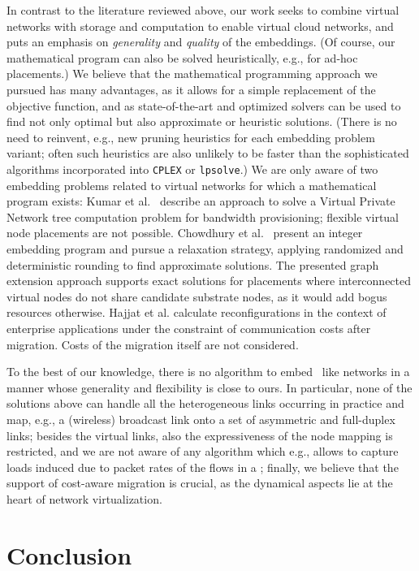 \documentclass[conference,10pt]{IEEEtran}
\newcommand{\CloudNet}{\text{CloudNet}}
\begin{document}
In contrast to the literature reviewed above, our work seeks to
combine virtual networks with storage and computation to enable
virtual cloud networks, and puts an emphasis on \emph{generality} and
\emph{quality} of the embeddings. (Of course, our mathematical
program can also be solved heuristically, e.g., for ad-hoc
placements.) We believe that the mathematical programming approach
we pursued has many advantages, as it allows for a simple
replacement of the objective function, and as state-of-the-art
and optimized solvers can be used to find not only optimal but also
approximate or heuristic solutions. (There is no need to reinvent,
e.g., new pruning heuristics for each embedding problem variant;
often such heuristics are also unlikely to be faster than the
sophisticated algorithms incorporated into \texttt{CPLEX} or
\texttt{lpsolve}.) We are only aware of two embedding problems
related to virtual networks for which a mathematical program exists:
Kumar et al.~\cite{hose} describe an approach to solve a Virtual
Private Network tree computation problem for bandwidth provisioning;
flexible virtual node placements are not possible. Chowdhury et
al.~\cite{infocom2009} present an integer embedding program and
pursue a relaxation strategy, applying randomized and deterministic
rounding to find approximate solutions. The presented graph
extension approach supports exact solutions for placements where
interconnected virtual nodes do not share candidate substrate nodes,
as it would add bogus resources otherwise.
Hajjat et al. \cite{clwardsigc11} calculate
reconfigurations in the context of enterprise applications under the
constraint of communication costs after migration. Costs of the
migration itself are not considered.

To the best of our knowledge, there is no algorithm to embed
\CloudNet\ like networks in a manner whose generality and
flexibility is close to ours. In particular, none of the solutions
above can handle all the heterogeneous links occurring in practice
and map, e.g., a (wireless) broadcast link onto a set of asymmetric
and full-duplex links; besides the virtual links, also the
expressiveness of the node mapping is restricted, and we are not
aware of any algorithm which e.g., allows to capture loads induced
due to packet rates of the flows in a \CloudNet; finally, we believe
that the support of cost-aware migration is crucial, as the
dynamical aspects lie at the heart of network virtualization.

\section{Conclusion}\label{sec:conclusion}
\end{document}

